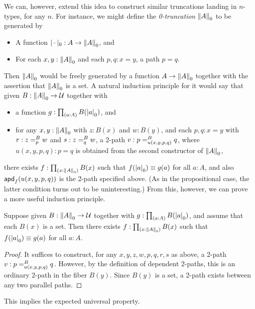 We can, however, extend this idea to construct similar truncations landing in $n$-types, for any $n$.
For instance, we might define the \emph{0-trun\-ca\-tion} $\trunc0A$ to be generated by
\begin{itemize}
\item A function $\tprojf0 : A \to \trunc0 A$, and
\item For each $x,y:\trunc0A$ and each $p,q:x=y$, a path $p=q$.
\end{itemize}
Then $\trunc0A$ would be freely generated by a function $A\to \trunc0A$ together with the assertion that $\trunc0A$ is a set.
A natural induction principle for it would say that given $B:\trunc0 A \to \type$ together with
\begin{itemize}
\item a function $g:\prd{a:A} B(\tproj0a)$, and
\item for any $x,y:\trunc0A$ with $z:B(x)$ and $w:B(y)$, and each $p,q:x=y$ with $r:\dpath{B}{p}{z}{w}$ and $s:\dpath{B}{q}{z}{w}$, a 2-path $v:\dpath{B}{u(x,y,p,q)}{p}{q}$, where $u(x,y,p,q):p=q$ is obtained from the second constructor of $\trunc0A$,
\end{itemize}
there exists $f:\prd{x:\trunc0A} B(x)$ such that $f(\tproj0a)\jdeq g(a)$ for all $a:A$, and also $\apd{f}{u(x,y,p,q)}$ is the 2-path specified above.
(As in the propositional case, the latter condition turns out to be uninteresting.)
From this, however, we can prove a more useful induction principle.

\begin{lem}\label{thm:trunc0-ind}
  Suppose given $B:\trunc0 A \to \type$ together with $g:\prd{a:A} B(\tproj0a)$, and assume that each $B(x)$ is a set.
  Then there exists $f:\prd{x:\trunc0A} B(x)$ such that $f(\tproj0a)\jdeq g(a)$ for all $a:A$.
\end{lem}
\begin{proof}
  It suffices to construct, for any $x,y,z,w,p,q,r,s$ as above, a 2-path $v:\dpath{B}{u(x,y,p,q)}{p}{q}$.
  However, by the definition of dependent 2-paths, this is an ordinary 2-path in the fiber $B(y)$.
  Since $B(y)$ is a set, a 2-path exists between any two parallel paths.
\end{proof}

This implies the expected universal property.

